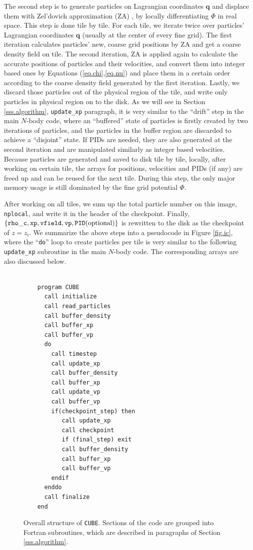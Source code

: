 \documentclass[10pt,twocolumn,preprint]{emulateapj}
\newcommand{\bs}{\boldsymbol}
\begin{document}
The second step is to generate particles on Lagrangian coordinates ${\bs q}$ and displace them with Zel'dovich approximation (ZA) \citep{1970A&A.....5...84Z}, by locally differentiating $\Phi$ in real space. This step is done tile by tile. For each tile, we iterate twice over particles' Lagrangian coordinates ${\bs q}$ (usually at the center of every fine grid). The first iteration calculates particles' new, coarse grid positions by ZA and get a coarse density field on tile. The second iteration, ZA is applied again to calculate the accurate positions of particles and their velocities, and convert them into integer based ones by Equations (\ref{eq.chi},\ref{eq.nu}) and place them in a certain order according to the coarse density field generated by the first iteration. Lastly, we discard those particles out of the physical region of the tile, and write only particles in physical region on to the disk. As we will see in Section \ref{sss.algorithm}, {\tt update\_xp} paragraph, it is very similar to the ``drift'' step in the main $N$-body code, where an ``buffered'' state of particles is firstly created by two iterations of particles, and the particles in the buffer region are discarded to achieve a ``disjoint'' state. If PIDs are needed, they are also generated at the second iteration and are manipulated similarly as integer based velocities. Because particles are generated and saved to disk tile by tile, locally, after working on certain tile, the arrays for positions, velocities and PIDs (if any) are freed up and can be reused for the next tile. During this step, the only major memory usage is still dominated by the fine grid potential $\Phi$.

After working on all tiles, we sum up the total particle number on this image, {\tt nplocal}, and write it in the header of the checkpoint. Finally, $\{{\tt rho\_c},{\tt xp},{\tt vfield},{\tt vp},{\tt PID}({\rm optional})\}$ is rewritten to the disk as the checkpoint of $z=z_i$. We summarize the above steps into a pseudocode in Figure \ref{fig.ic}, where the ``{\tt do}'' loop to create particles per tile is very similar to the following {\tt update\_xp} subroutine in the main $N$-body code. The corresponding arrays are also discussed below.  


\begin{figure}[]
\begin{verbatim}

    program CUBE
      call initialize
      call read_particles
      call buffer_density
      call buffer_xp
      call buffer_vp
      do
        call timestep
        call update_xp
        call buffer_density
        call buffer_xp
        call update_vp
        call buffer_vp
        if(checkpoint_step) then
           call update_xp
           call checkpoint
           if (final_step) exit
           call buffer_density
           call buffer_xp
           call buffer_vp
        endif
      enddo
      call finalize
    end
\end{verbatim}
\caption{Overall structure of {\tt CUBE}. Sections of the code are grouped into Fortran subroutines, which are described in paragraphs of Section \ref{sss.algorithm}.}
\label{fig.code}
\end{figure}
\end{document}
